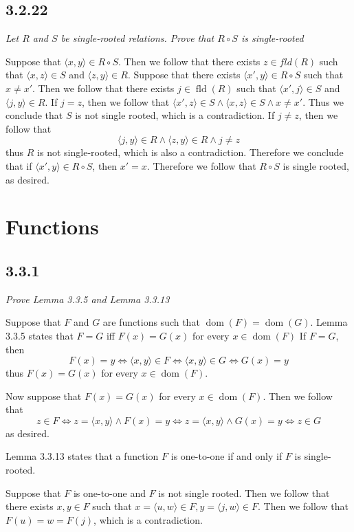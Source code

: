 \documentclass[11pt,oneside,titlepage]{book}
\DeclareMathOperator \fld {fld}
\DeclareMathOperator \lra {\Leftrightarrow}
\DeclareMathOperator \dom {dom}
\newcommand{\eangle}[1]{\langle #1 \rangle}
\begin{document}
\subsection*{3.2.22}

\textit{Let $R$ and $S$ be single-rooted relations. Prove that $R \circ S$ is
  single-rooted}

Suppose that $\eangle{x, y} \in R \circ S$. Then we follow that there exists $z \in
fld(R)$ such that
$\eangle{x, z} \in S$ and $\eangle{z, y} \in R$. Suppose that there exists  $\eangle{x', y} \in
R \circ S$ such that $x \neq x'$. Then we follow that there exists $j \in \fld(R)$ such that
$\eangle{x', j} \in S$ and $\eangle{j, y} \in R$. If $j = z$, then we follow that
$\eangle{x', z} \in S \land \eangle{x, z} \in S \land x \neq x'$. Thus we conclude that $S$ is not
single rooted, which is a contradiction. If $j \neq z$, then we follow that
$$\eangle{j, y} \in R \land \eangle{z, y} \in R \land j \neq z$$
thus $R$ is not single-rooted, which is also a contradiction. Therefore we conclude that
if $\eangle{x', y} \in R \circ S$, then $x' = x$. Therefore we follow that $R \circ S$ is
single rooted, as desired.

\section{Functions}

\subsection*{3.3.1}

\textit{Prove Lemma 3.3.5 and Lemma 3.3.13}

Suppose that $F$ and $G$ are functions such that $\dom(F) = \dom(G)$. 
Lemma 3.3.5 states that $F = G$ iff $F(x) = G(x)$ for every $x \in \dom(F)$
If $F = G$, then
$$F(x) = y \lra \eangle{x, y} \in F \lra \eangle{x, y} \in G \lra G(x) = y$$
thus $F(x) = G(x)$ for every $x \in \dom(F)$.

Now suppose that $F(x) = G(x)$ for every $x \in \dom(F)$. Then we follow that
$$z \in F \lra z = \eangle{x, y} \land F(x) = y \lra
z = \eangle{x, y} \land G(x) = y \lra z \in G$$
as desired.

Lemma 3.3.13 states that a function $F$ is one-to-one if and only if $F$ is single-rooted.

Suppose that $F$ is one-to-one and $F$ is not single rooted. Then we follow that
there exists $x, y \in F$ such that $x = \eangle{u, w} \in F, y = \eangle{j, w} \in F$.
Then we follow that $F(u) = w = F(j)$, which is a contradiction.
\end{document}
